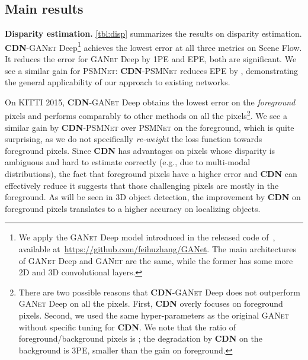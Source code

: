 \documentclass{article}
\newcommand{\method}[1]{\textsc{#1}}
\newcommand{\PSMNet}{\method{PSMNet}\xspace}
\newcommand{\GANet}{\method{GANet}\xspace}
\newcommand{\CDN}{\textbf{\method{CDN}}\xspace}
\renewcommand{\paragraph}[1]{\vspace{-0.5ex}\textbf{#1}}
\newcommand{\eg}{e.g.\xspace}
\begin{document}
\subsection{Main results}
\label{ssec:ER}

\paragraph{Disparity estimation.} \autoref{tbl:disp} summarizes the results on disparity estimation. \CDN-\GANet Deep\footnote{We apply the \GANet Deep model introduced in the released code of~\cite{zhang2019ga}, available at~\url{https://github.com/feihuzhang/GANet}. The main architectures of \GANet Deep and \GANet are the same, while the former has some more 2D and 3D convolutional layers.} achieves the lowest error at all three metrics on Scene Flow. It reduces the error for \GANet Deep by  1PE and  EPE, both are significant. We see a similar gain for \PSMNet: \CDN-\PSMNet reduces EPE by , demonstrating the general applicability of our approach to existing networks.


On KITTI 2015, \CDN-\GANet Deep obtains the lowest error on the \emph{foreground} pixels and performs comparably to other methods on all the pixels\footnote{There are two possible reasons that \CDN-\GANet Deep does not outperform \GANet Deep on all the pixels. First, \CDN overly focuses on foreground pixels. Second, we used the same hyper-parameters as the original \GANet without specific tuning for \CDN. We note that the ratio of foreground/background pixels is ; the degradation by \CDN on the background is  3PE, smaller than the gain on foreground.}. We see a similar gain by \CDN-\PSMNet over \PSMNet on the foreground, which is quite surprising, as we do not specifically \emph{re-weight} the loss function towards foreground pixels. Since \CDN has advantages on pixels whose disparity is ambiguous and hard to estimate correctly (\eg, due to multi-modal distributions), the fact that foreground pixels have a higher error and \CDN can effectively reduce it suggests that those challenging pixels are mostly in the foreground. 
As will be seen in 3D object detection, the improvement by \CDN on foreground pixels translates to a higher accuracy on localizing objects.
\end{document}
